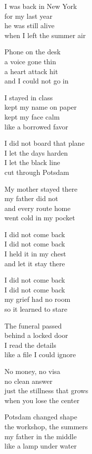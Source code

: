 \begin{lyrics}
I was back in New York\\
for my last year\\
he was still alive\\
when I left the summer air

Phone on the desk\\
a voice gone thin\\
a heart attack hit\\
and I could not go in

I stayed in class\\
kept my name on paper\\
kept my face calm\\
like a borrowed favor

I did not board that plane\\
I let the days harden\\
I let the black line\\
cut through Potsdam

My mother stayed there\\
my father did not\\
and every route home\\
went cold in my pocket

I did not come back\\
I did not come back\\
I held it in my chest\\
and let it stay there

I did not come back\\
I did not come back\\
my grief had no room\\
so it learned to stare

The funeral passed\\
behind a locked door\\
I read the details\\
like a file I could ignore

No money, no visa\\
no clean answer\\
just the stillness that grows\\
when you lose the center

Potsdam changed shape\\
the workshop, the summers\\
my father in the middle\\
like a lamp under water


\end{lyrics}
